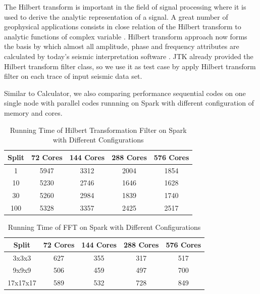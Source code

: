 The Hilbert transform \cite{HilbertWiki} is important in the field of signal processing where it is used to derive the analytic representation of a signal. A great number of geophysical applications consists in close relation of the Hilbert transform to analytic functions of complex variable \cite{HilbertGeoApplication}. Hilbert transform approach now forms the basis by which almost all amplitude, phase and frequency attributes are calculated by today’s seismic interpretation software \cite{HilbertSeismic}. JTK already provided the Hilbert transform filter class, so we use it as test case by apply Hilbert transform filter on each trace of input seismic data set.

Similar to Calculator, we also comparing performance sequential codes on one single node with parallel codes runnning on Spark with different configuration of memory and cores. 


\begin{table}[H]
\caption{Running Time of Hilbert Transformation Filter on Spark with Different Configurations}
\centering
\begin{tabular}{||c| c c c c ||} 
 \hline
 Split & 72 Cores & 144 Cores & 288 Cores & 576 Cores \\ [0.5ex] 
 \hline
  1 & 5947 & 3312 &	2004 &	1854 \\
  10 & 5230 & 2746 &	1646 &	1628 \\
  30 & 5260 & 2984 &	1839 &	1740 \\
  100 & 5328 & 3357 &	2425 &	2517 \\
 \hline
\end{tabular}
\label{table:HilbertSpark}
\end{table}

\begin{table}[H]
\caption{Running Time of FFT on Spark with Different Configurations}
\centering
\begin{tabular}{||c| c c c c ||} 
 \hline
 Split & 72 Cores & 144 Cores & 288 Cores & 576 Cores \\ [0.5ex] 
 \hline
 3x3x3 & 627 & 355 & 317 & 517 \\ 
 9x9x9 & 506 & 459 & 497 & 700 \\
 17x17x17 & 589 & 532 & 728 & 849 \\
 \hline
 \end{tabular}
 \label{table:FFTSpark}
 \end{table}

